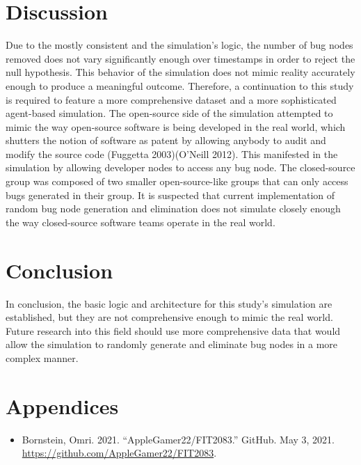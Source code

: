 \documentclass[10pt, a4paper, fleqn]{article}
\begin{document}
\section{Discussion}
Due to the mostly consistent and the simulation's logic, the number of bug nodes removed does not vary significantly enough over timestamps in order to reject the null hypothesis. This behavior of the simulation does not mimic reality accurately enough to produce a meaningful outcome. Therefore, a continuation to this study is required to feature a more comprehensive dataset and a more sophisticated agent-based simulation.
\bigbreak
The open-source side of the simulation attempted to mimic the way open-source software is being developed in the real world, which shutters the notion of software as patent by allowing anybody to audit and modify the source code (Fuggetta 2003)(O’Neill 2012). This manifested in the simulation by allowing developer nodes to access any bug node. The closed-source group was composed of two smaller open-source-like groups that can only access bugs generated in their group. It is suspected that current implementation of random bug node generation and elimination does not simulate closely enough the way closed-source software teams operate in the real world.
\section{Conclusion}
In conclusion, the basic logic and architecture for this study's simulation are established, but they are not comprehensive enough to mimic the real world. Future research into this field should use more comprehensive data that would allow the simulation to randomly generate and eliminate bug nodes in a more complex manner.
\newpage
\section{Appendices}
\begin{itemize}
	\item Bornstein, Omri. 2021. “AppleGamer22/FIT2083.” GitHub. May 3, 2021. \url{https://github.com/AppleGamer22/FIT2083}.
\end{itemize}
\end{document}
